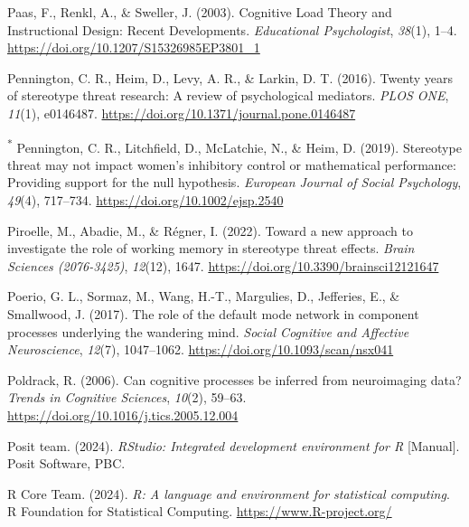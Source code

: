 \documentclass[
  stu, a4paper, 12pt,mask,floatsintext]{apa7}
\newlength{\cslhangindent}
\newenvironment{CSLReferences}[2] %
 {\begin{list}{}{%
  \setlength{\itemindent}{0pt}
  \setlength{\leftmargin}{0pt}
  \setlength{\parsep}{0pt}
  \ifodd #1
   \setlength{\leftmargin}{\cslhangindent}
   \setlength{\itemindent}{-1\cslhangindent}
  \fi
  \setlength{\itemsep}{#2\baselineskip}}}
 {\end{list}}
\begin{document}
\begin{CSLReferences}{1}{0}
Paas, F., Renkl, A., \& Sweller, J. (2003). Cognitive {Load Theory} and {Instructional Design}: {Recent Developments}. \emph{Educational Psychologist}, \emph{38}(1), 1--4. \url{https://doi.org/10.1207/S15326985EP3801_1}

Pennington, C. R., Heim, D., Levy, A. R., \& Larkin, D. T. (2016). Twenty years of stereotype threat research: A review of psychological mediators. \emph{PLOS ONE}, \emph{11}(1), e0146487. \url{https://doi.org/10.1371/journal.pone.0146487}

\textsuperscript{*} Pennington, C. R., Litchfield, D., McLatchie, N., \& Heim, D. (2019). Stereotype threat may not impact women's inhibitory control or mathematical performance: {Providing} support for the null hypothesis. \emph{European Journal of Social Psychology}, \emph{49}(4), 717--734. \url{https://doi.org/10.1002/ejsp.2540}

Piroelle, M., Abadie, M., \& Régner, I. (2022). Toward a new approach to investigate the role of working memory in stereotype threat effects. \emph{Brain Sciences (2076-3425)}, \emph{12}(12), 1647. \url{https://doi.org/10.3390/brainsci12121647}

Poerio, G. L., Sormaz, M., Wang, H.-T., Margulies, D., Jefferies, E., \& Smallwood, J. (2017). The role of the default mode network in component processes underlying the wandering mind. \emph{Social Cognitive and Affective Neuroscience}, \emph{12}(7), 1047--1062. \url{https://doi.org/10.1093/scan/nsx041}

Poldrack, R. (2006). Can cognitive processes be inferred from neuroimaging data? \emph{Trends in Cognitive Sciences}, \emph{10}(2), 59--63. \url{https://doi.org/10.1016/j.tics.2005.12.004}

Posit team. (2024). \emph{{RStudio}: {Integrated} development environment for {R}} {[}Manual{]}. Posit Software, PBC.

R Core Team. (2024). \emph{R: A language and environment for statistical computing}. R Foundation for Statistical Computing. \url{https://www.R-project.org/}


\end{CSLReferences}
\end{document}
